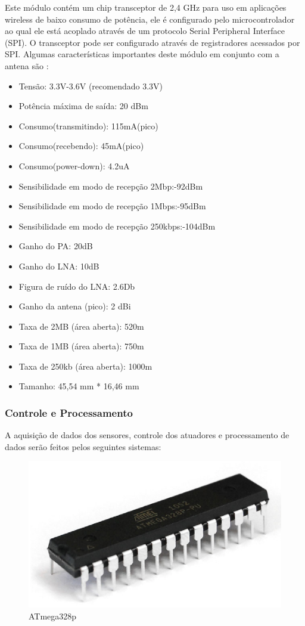 Este módulo contém um chip transceptor de 2,4 GHz para uso em aplicações wireless de baixo consumo de potência, ele é configurado pelo microcontrolador ao qual ele está acoplado através de um protocolo Serial Peripheral Interface (SPI). O transceptor pode ser  configurado através de registradores acessados por SPI. Algumas características importantes deste módulo em conjunto com a antena são \cite{mercado3}:
\begin{itemize}
\item Tensão: 3.3V-3.6V (recomendado 3.3V)
\item Potência máxima de saída: 20 dBm
\item Consumo(transmitindo): 115mA(pico)
\item Consumo(recebendo): 45mA(pico)
\item Consumo(power-down): 4.2uA
\item Sensibilidade em modo de recepção 2Mbp:-92dBm
\item Sensibilidade em modo de recepção 1Mbps:-95dBm
\item Sensibilidade em modo de recepção 250kbps:-104dBm
\item Ganho do PA: 20dB
\item Ganho do LNA: 10dB
\item Figura de ruído do LNA: 2.6Db
\item Ganho da antena (pico): 2 dBi
\item Taxa de 2MB (área aberta): 520m
\item Taxa de 1MB (área aberta): 750m
\item Taxa de 250kb (área aberta): 1000m
\item Tamanho: 45,54 mm * 16,46 mm
\end{itemize}

\subsubsection{Controle e Processamento}

A aquisição de dados dos sensores, controle dos atuadores e processamento de dados serão feitos pelos seguintes sistemas:


\begin{figure}[H]
 \centering
   \includegraphics[keepaspectratio=true,scale=0.8]{figuras/atmega328.eps}
 \caption{ATmega328p}
 \label{ATmega328p}
\end{figure}


